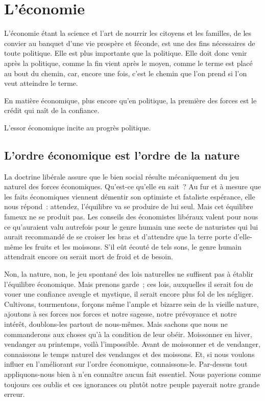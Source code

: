 \documentclass[french,twoside]{book} %
\newcommand{\astermono}{\medskip\centerline{\color{rubric}\large\selectfont{\syms ✻}}\medskip\par}%
\newcommand\chaptercont{} %
\begin{document}
\chaptercont
\section[L’économie]{L’économie}
\noindent L’économie étant la science et l’art de nourrir les citoyens et les familles, de les convier au banquet d’une vie prospère et féconde, est une des fins nécessaires de toute politique. Elle est plus importante que la politique. Elle doit donc venir après la politique, comme la fin vient après le moyen, comme le terme est placé au bout du chemin, car, encore une fois, c’est le chemin que l’on prend si l’on veut atteindre le terme.\par

\astermono

\noindent En matière économique, plus encore qu’en politique, la première des forces est le crédit qui naît de la confiance.\par

\astermono

\noindent L’essor économique incite au progrès politique.\par

\astermono

\subsection[L’ordre économique est l’ordre de la nature]{L’ordre économique est l’ordre de la nature}
\noindent La doctrine libérale assure que le bien social résulte mécaniquement du jeu naturel des forces économiques. Qu’est-ce qu’elle en sait ? Au fur et à mesure que les faits économiques viennent démentir son optimiste et fataliste espérance, elle nous répond : attendez, l’équilibre va se produire de lui seul. Mais cet équilibre fameux ne se produit pas. Les conseils des économistes libéraux valent pour nous ce qu’auraient valu autrefois pour le genre humain une secte de naturistes qui lui aurait recommandé de se croiser les bras et d’attendre que la terre porte d’elle-même les fruits et les moissons. S’il eût écouté de tels sons, le genre humain attendrait encore ou serait mort de froid et de besoin.\par
Non, la nature, non, le jeu spontané des lois naturelles ne suffisent pas à établir l’équilibre économique. Mais prenons garde ; ces lois, auxquelles il serait fou de vouer une confiance aveugle et mystique, il serait encore plus fol de les négliger. Cultivons, tourmentons, forçons même l’ample et bizarre sein de la vieille nature, ajoutons à ses forces nos forces et notre sagesse, notre prévoyance et notre intérêt, doublons-les partout de nous-mêmes. Mais sachons que nous ne commanderons aux choses qu’à la condition de leur obéir. Moissonner en hiver, vendanger au printemps, voilà l’impossible. Avant de moissonner et de vendanger, connaissons le temps naturel des vendanges et des moissons. Et, si nous voulons influer en l’améliorant sur l’ordre économique, connaissons-le. Par-dessus tout appliquons-nous bien à n’en connaître aucun fait essentiel. Nous payerions comme toujours ces oublis et ces ignorances ou plutôt notre peuple payerait notre grande erreur.\par
\end{document}
